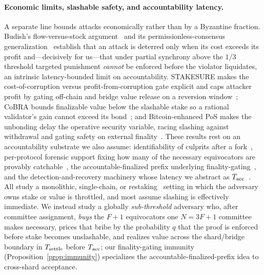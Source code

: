 \paragraph{Economic limits, slashable safety, and accountability latency.}
A separate line bounds attacks economically rather than by a Byzantine fraction. Budish's
flow-versus-stock argument~\cite{budish2018economic} and its permissionless-consensus
generalization~\cite{budish2024economic} establish that an attack is deterred only when its cost
exceeds its profit and---decisively for us---that under partial synchrony above the $1/3$ threshold
targeted punishment \emph{cannot} be enforced before the violator liquidates, an intrinsic
latency-bounded limit on accountability. STAKESURE makes the cost-of-corruption versus
profit-from-corruption gate explicit and caps attacker profit by gating off-chain and bridge value
release on a reversion window~\cite{deb2024stakesure}; CoBRA bounds finalizable value below the
slashable stake so a rational validator's gain cannot exceed its bond~\cite{avarikioti2025cobra}; and
Bitcoin-enhanced PoS makes the unbonding delay the operative security variable, racing slashing
against withdrawal and gating safety on external finality~\cite{tas2023bitcoin}. These results rest on
an accountability substrate we also assume: identifiability of culprits after a
fork~\cite{civit2021polygraph}, per-protocol forensic support fixing how many of the necessary
equivocators are provably catchable~\cite{sheng2021forensics}, the accountable-finalized prefix
underlying finality-gating~\cite{neu2022accountability}, and the detection-and-recovery machinery
whose latency we abstract as $T_{\mathrm{acc}}$~\cite{gong2025recover}. All study a monolithic, single-chain, or
restaking~\cite{durvasula2025restaking} setting in which the adversary owns stake or value is
throttled, and most assume slashing is effectively immediate. We instead study a globally
\emph{sub-threshold} adversary who, after committee assignment, \emph{buys} the $F{+}1$ equivocators
one $N{=}3F{+}1$ committee makes necessary, prices that bribe by the probability $q$ that the proof is
enforced before stake becomes unslashable, and realizes value across the shard/bridge boundary in
$T_{\mathrm{settle}}$ before $T_{\mathrm{acc}}$; our finality-gating immunity (Proposition~\ref{prop:immunity}) specializes
the accountable-finalized-prefix idea to cross-shard acceptance.

